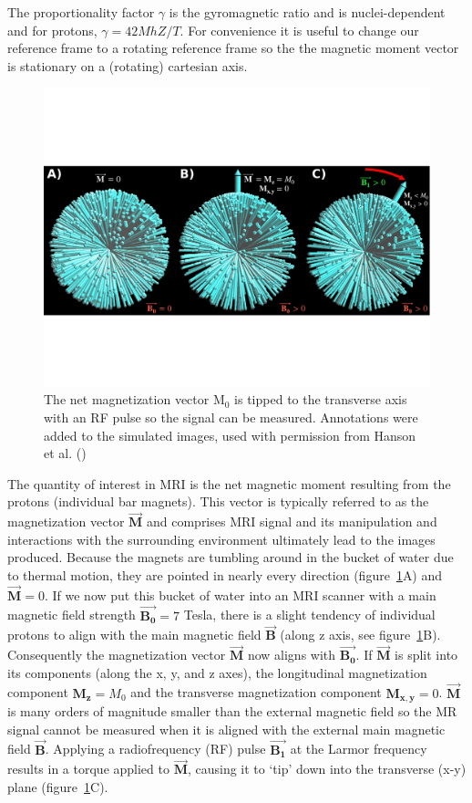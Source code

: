 The proportionality factor $\gamma$ is the gyromagnetic ratio and is nuclei-dependent and for protons, $\gamma = 42 MhZ /T$.
For convenience it is useful to change our reference frame to a rotating reference frame so the the magnetic moment vector is stationary on a (rotating) cartesian axis.
\begin{figure}
	\centering
	\includegraphics[width=\textwidth]{./intro/intro-images/HansonMRI.pdf}
	\caption[Spins getting tipped with an RF pulse]{The net magnetization vector M$_0$ is tipped to the transverse axis with an RF pulse so the signal can be measured. 
Annotations were added to the simulated images, used with permission from Hanson et al. 
(\cite{Hanson:2008tp})}
	\label{spinsB0B1}
\end{figure}

The quantity of interest in MRI is the net magnetic moment resulting from the protons (individual bar magnets).
This vector is typically referred to as the magnetization vector $\vec{\mathbf{M}}$ and comprises MRI signal and its manipulation and interactions with the surrounding environment ultimately lead to the images produced.
Because the magnets are tumbling around in the bucket of water due to thermal motion, they are pointed in nearly every direction (figure~\ref{spinsB0B1}A) and $\vec{\mathbf{M}} = 0$.
If we now put this bucket of water into an MRI scanner with a main magnetic field strength $\vec{\mathbf{B_0}} = 7$ Tesla, there is a slight tendency of individual protons to align with the main magnetic field $\vec{\mathbf{B}}$ (along z axis, see figure~\ref{spinsB0B1}B).
Consequently the magnetization vector $\vec{\mathbf{M}}$ now aligns with $\vec{\mathbf{B_0}}$.
If $\vec{\mathbf{M}}$ is split into its components (along the x, y, and z axes), the longitudinal magnetization component $\mathbf{M_z} = M_0$ and the transverse magnetization component $\mathbf{M_{x,y}} = 0$.
$\vec{\mathbf{M}}$ is many orders of magnitude smaller than the external magnetic field so the MR signal cannot be measured when it is aligned with the external main magnetic field $\vec{\mathbf{B}}$. 
Applying a radiofrequency (RF) pulse $\vec{\mathbf{B_1}}$ at the Larmor frequency results in a torque applied to $\vec{\mathbf{M}}$, causing it to `tip' down into the transverse (x-y) plane (figure~\ref{spinsB0B1}C).

